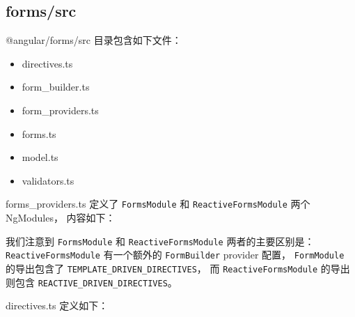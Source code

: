 \subsection{forms/src}


@angular/forms/src 目录包含如下文件：

\begin{itemize}
  \item directives.ts
  \item form\_builder.ts
  \item form\_providers.ts
  \item forms.ts
  \item model.ts
  \item validators.ts
\end{itemize}


forms\_providers.ts 定义了 \texttt{FormsModule} 和 \texttt{ReactiveFormsModule} 两个 NgModules，
内容如下：




我们注意到 \texttt{FormsModule} 和 \texttt{ReactiveFormsModule} 两者的主要区别是：
\texttt{ReactiveFormsModule} 有一个额外的 \texttt{FormBuilder} provider 配置，
\texttt{FormModule} 的导出包含了 \texttt{TEMPLATE\_DRIVEN\_DIRECTIVES}，
而 \texttt{ReactiveFormsModule} 的导出则包含 \texttt{REACTIVE\_DRIVEN\_DIRECTIVES}。


directives.ts 定义如下：




